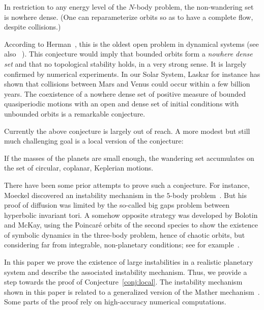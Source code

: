 \begin{conjecture}
  \label{conj:Herman}
  In restriction to any energy level of the $N$-body problem, the
  non-wandering set is nowhere dense. (One can reparameterize orbits
  so as to have a complete flow, despite collisions.)
\end{conjecture}

According to
Herman~\cite{Herman:1998}, this is the oldest open problem in
dynamical systems (see also ~\cite{Kolmogorov54b}). This conjecture would imply
that bounded orbits form a {\it nowhere dense set} and that no
topological stability holds, in a very strong sense.  It is largely
confirmed by numerical experiments. In our Solar System, Laskar for
instance has shown that collisions between Mars and Venus could occur
within a few billion years. The coexistence of a nowhere
dense set of positive measure of bounded quasiperiodic motions with an
open and dense set of initial conditions with unbounded orbits is
a remarkable conjecture.

Currently the above conjecture is largely out of reach. A more modest
but still much challenging goal is a local version of the conjecture:

\begin{conjecture}\label{conj:local}
  If the masses of the planets are small enough, the wandering set
  accumulates on the set of circular, coplanar, Keplerian motions.
\end{conjecture}

There have been some prior attempts to prove such a conjecture. For
instance, Moeckel discovered an instability mechanism in the
$5$-body problem~\cite{Moeckel:1995}. But his proof of diffusion was
limited by the so-called big gaps problem between hyperbolic invariant
tori. A somehow opposite strategy was developed by Bolotin and McKay,
using the Poincar{\'e} orbits of the second species to show the existence
of symbolic dynamics in the three-body problem, hence of 
chaotic orbits, but considering far from integrable, non-planetary conditions; see for
example~\cite{Bolotin:2006}.

In this paper we prove the existence of  large instabilities
 in a realistic planetary system and describe the associated instability mechanism. Thus, we provide a step
towards the proof of Conjecture~\ref{conj:local}. The instability mechanism shown in this paper is related
to a generalized version of the Mather mechanism~\cite{Mather96,BolotinT99,
DelshamsLS00,Gelfreich:2008,Kaloshin03}.  Some parts of the proof rely on high-accuracy
numerical computations.


